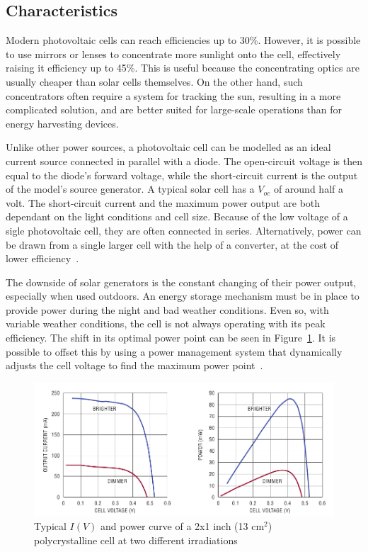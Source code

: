 \documentclass[a4paper,10pt]{article}
\begin{document}
\subsection{Characteristics}

Modern photovoltaic cells can reach efficiencies up to 30\%. However, it is possible to use mirrors or lenses to concentrate more sunlight onto the cell, effectively raising it efficiency up to 45\%. This is useful because the concentrating optics are usually cheaper than solar cells themselves. On the other hand, such concentrators often require a system for tracking the sun, resulting in a more complicated solution, and are better suited for large-scale operations than for energy harvesting devices. 

Unlike other power sources, a photovoltaic cell can be modelled as an ideal current source connected in parallel with a diode. The open-circuit voltage is then equal to the diode's forward voltage, while the short-circuit current is the output of the model's source generator. A typical solar cell has a $V_{oc}$ of around half a volt. The short-circuit current and the maximum power output are both dependant on the light conditions and cell size. Because of the low voltage of a sigle photovoltaic cell, they are often connected in series. Alternatively, power can be drawn from a single larger cell with the help of a converter, at the cost of lower efficiency~\cite{Burgoine11}. 

The downside of solar generators is the constant changing of their power output, especially when used outdoors. An energy storage mechanism must be in place to provide power during the night and bad weather conditions. Even so, with variable weather conditions, the cell is not always operating with its peak efficiency. The shift in its optimal power point can be seen in Figure~\ref{fig:pv-power-curve}. It is possible to offset this by using a power management system that dynamically adjusts the cell voltage to find the maximum power point~\cite{solar-mppt-ieee}. 

\begin{figure}[h!]
\includegraphics[width=\textwidth]{./Slike/PV-power-curve}
 \caption{Typical $I(V)$ and power curve of a 2x1 inch (13 cm$^2$) polycrystalline cell at two different irradiations~\cite{Burgoine11}}
\label{fig:pv-power-curve}
\end{figure}
\end{document}
